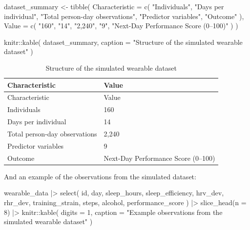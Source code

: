 \documentclass[
  letterpaper,
  DIV=11,
  numbers=noendperiod]{scrreprt}
\newenvironment{Shaded}{\begin{snugshade}}{\end{snugshade}}
\newcommand{\AttributeTok}[1]{\textcolor[rgb]{0.40,0.45,0.13}{#1}}
\newcommand{\DecValTok}[1]{\textcolor[rgb]{0.68,0.00,0.00}{#1}}
\newcommand{\FunctionTok}[1]{\textcolor[rgb]{0.28,0.35,0.67}{#1}}
\newcommand{\NormalTok}[1]{\textcolor[rgb]{0.00,0.23,0.31}{#1}}
\newcommand{\OtherTok}[1]{\textcolor[rgb]{0.00,0.23,0.31}{#1}}
\newcommand{\SpecialCharTok}[1]{\textcolor[rgb]{0.37,0.37,0.37}{#1}}
\newcommand{\StringTok}[1]{\textcolor[rgb]{0.13,0.47,0.30}{#1}}
\begin{document}
\begin{Shaded}
\begin{Highlighting}[]
\NormalTok{dataset\_summary }\OtherTok{\textless{}{-}} \FunctionTok{tibble}\NormalTok{(}
  \AttributeTok{Characteristic =} \FunctionTok{c}\NormalTok{(}
    \StringTok{"Individuals"}\NormalTok{,}
    \StringTok{"Days per individual"}\NormalTok{,}
    \StringTok{"Total person{-}day observations"}\NormalTok{,}
    \StringTok{"Predictor variables"}\NormalTok{,}
    \StringTok{"Outcome"}
\NormalTok{  ),}
  \AttributeTok{Value =} \FunctionTok{c}\NormalTok{(}
    \StringTok{"160"}\NormalTok{,}
    \StringTok{"14"}\NormalTok{,}
    \StringTok{"2,240"}\NormalTok{,}
    \StringTok{"9"}\NormalTok{,}
    \StringTok{"Next{-}Day Performance Score (0–100)"}
\NormalTok{  )}
\NormalTok{)}

\NormalTok{knitr}\SpecialCharTok{::}\FunctionTok{kable}\NormalTok{(}
\NormalTok{  dataset\_summary,}
  \AttributeTok{caption =} \StringTok{"Structure of the simulated wearable dataset"}
\NormalTok{)}
\end{Highlighting}
\end{Shaded}

\begin{longtable}[]{@{}ll@{}}
\caption{Structure of the simulated wearable dataset}\tabularnewline
\toprule\noalign{}
Characteristic & Value \\
\midrule\noalign{}
\endfirsthead
\toprule\noalign{}
Characteristic & Value \\
\midrule\noalign{}
\endhead
\bottomrule\noalign{}
\endlastfoot
Individuals & 160 \\
Days per individual & 14 \\
Total person-day observations & 2,240 \\
Predictor variables & 9 \\
Outcome & Next-Day Performance Score (0--100) \\
\end{longtable}

And an example of the observations from the simulated dataset:

\begin{Shaded}
\begin{Highlighting}[]
\NormalTok{wearable\_data }\SpecialCharTok{|\textgreater{}}
  \FunctionTok{select}\NormalTok{(}
\NormalTok{    id,}
\NormalTok{    day,}
\NormalTok{    sleep\_hours,}
\NormalTok{    sleep\_efficiency,}
\NormalTok{    hrv\_dev,}
\NormalTok{    rhr\_dev,}
\NormalTok{    training\_strain,}
\NormalTok{    steps,}
\NormalTok{    alcohol,}
\NormalTok{    performance\_score}
\NormalTok{  ) }\SpecialCharTok{|\textgreater{}}
  \FunctionTok{slice\_head}\NormalTok{(}\AttributeTok{n =} \DecValTok{8}\NormalTok{) }\SpecialCharTok{|\textgreater{}}
\NormalTok{  knitr}\SpecialCharTok{::}\FunctionTok{kable}\NormalTok{(}
    \AttributeTok{digits =} \DecValTok{1}\NormalTok{,}
    \AttributeTok{caption =} \StringTok{"Example observations from the simulated wearable dataset"}
\NormalTok{  )}
\end{Highlighting}
\end{Shaded}
\end{document}
